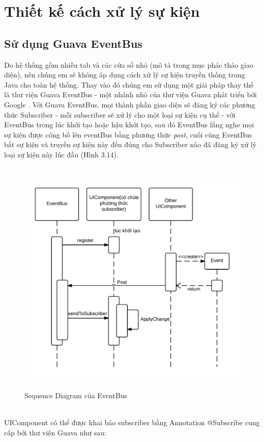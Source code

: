 {\section{Thiết kế cách xử lý sự kiện}
\subsection{Sử dụng Guava EventBus}
Do hệ thống gồm nhiều tab và các cửa sổ nhỏ (mô tả trong mục phác thảo giao diện), nên chúng em sẽ không áp dụng cách xử lý sự kiện truyền thống trong Java cho toàn hệ thống. Thay vào đó chúng em sử dụng một giải pháp thay thế là thư viện Guava EventBus - một nhánh nhỏ của thư viện Guava phát triển bởi Google \cite{guava}. Với Guava EventBus, mọi thành phần giao diện sẽ đăng ký các phương thức Subscriber - mỗi subscriber sẽ xử lý cho một loại sự kiện cụ thể -  với EventBus trong lúc khởi tạo hoặc hậu khởi tạo, sau đó EventBus lắng nghe mọi sự kiện được công bố lên eventBus bằng phương thức \textit{post}, cuối cùng EventBus bắt sự kiện và truyền sự kiện này đến đúng cho Subscriber nào đã đăng ký xử lý loại sự kiện này lúc đầu (Hình 3.14).
\begin{figure}[h!]
	\centering
	\includegraphics[height=115mm]{Figures/uml_eventbus_sequence.png}
	\caption{Sequence Diagram của EventBus \label{overflow}}
\end{figure}
\\
UIComponent có thể được khai báo subscriber bằng Annotation @Subscribe cung cấp bởi thư viện Guava như sau:
}
